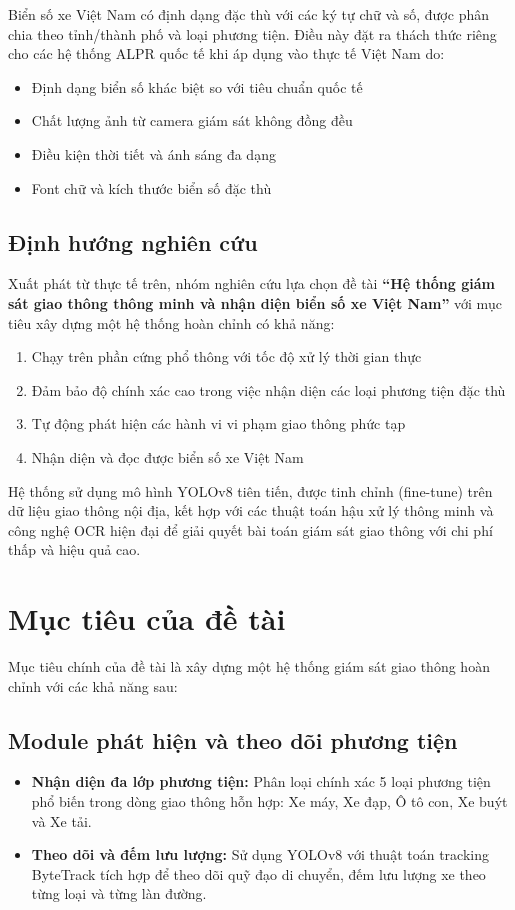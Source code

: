 Biển số xe Việt Nam có định dạng đặc thù với các ký tự chữ và số, được phân chia theo tỉnh/thành phố và loại phương tiện. Điều này đặt ra thách thức riêng cho các hệ thống ALPR quốc tế khi áp dụng vào thực tế Việt Nam do:
\begin{itemize}
    \item Định dạng biển số khác biệt so với tiêu chuẩn quốc tế
    \item Chất lượng ảnh từ camera giám sát không đồng đều
    \item Điều kiện thời tiết và ánh sáng đa dạng
    \item Font chữ và kích thước biển số đặc thù
\end{itemize}

\subsection{Định hướng nghiên cứu}
Xuất phát từ thực tế trên, nhóm nghiên cứu lựa chọn đề tài \textbf{``Hệ thống giám sát giao thông thông minh và nhận diện biển số xe Việt Nam''} với mục tiêu xây dựng một hệ thống hoàn chỉnh có khả năng:
\begin{enumerate}
    \item Chạy trên phần cứng phổ thông với tốc độ xử lý thời gian thực
    \item Đảm bảo độ chính xác cao trong việc nhận diện các loại phương tiện đặc thù
    \item Tự động phát hiện các hành vi vi phạm giao thông phức tạp
    \item Nhận diện và đọc được biển số xe Việt Nam
\end{enumerate}

Hệ thống sử dụng mô hình YOLOv8 tiên tiến, được tinh chỉnh (fine-tune) trên dữ liệu giao thông nội địa, kết hợp với các thuật toán hậu xử lý thông minh và công nghệ OCR hiện đại để giải quyết bài toán giám sát giao thông với chi phí thấp và hiệu quả cao.

\section{Mục tiêu của đề tài}
Mục tiêu chính của đề tài là xây dựng một hệ thống giám sát giao thông hoàn chỉnh với các khả năng sau:

\subsection{Module phát hiện và theo dõi phương tiện}
\begin{itemize}
    \item \textbf{Nhận diện đa lớp phương tiện:} Phân loại chính xác 5 loại phương tiện phổ biến trong dòng giao thông hỗn hợp: Xe máy, Xe đạp, Ô tô con, Xe buýt và Xe tải.
    \item \textbf{Theo dõi và đếm lưu lượng:} Sử dụng YOLOv8 với thuật toán tracking ByteTrack tích hợp để theo dõi quỹ đạo di chuyển, đếm lưu lượng xe theo từng loại và từng làn đường.
\end{itemize}

